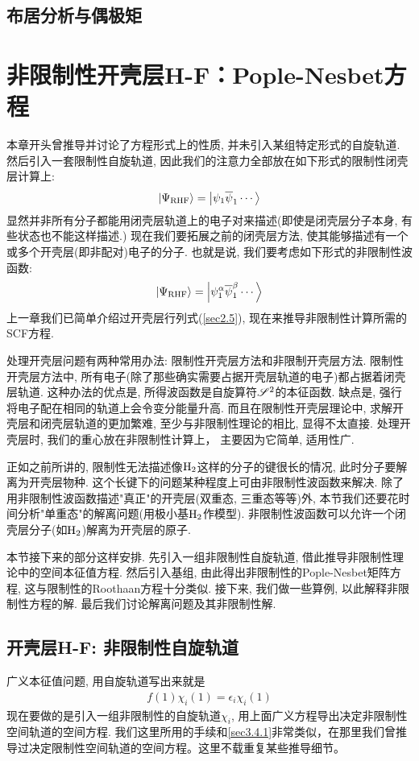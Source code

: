 {\subsection{布居分析与偶极矩}

\section{非限制性开壳层H-F：Pople-Nesbet方程}
本章开头曾推导并讨论了\hft 方程形式上的性质, 并未引入某组特定形式的自旋轨道. 然后引入一套限制性自旋轨道, 因此我们的注意力全部放在如下形式的限制性闭壳层计算上:
\begin{align}
\Ket{\Psi_\mathrm{RHF}} = \Ket{\psi_1\overline{\psi}_1\cdots}
\end{align}
显然并非所有分子都能用闭壳层轨道上的电子对来描述(即使是闭壳层分子本身, 有些状态也不能这样描述.) 现在我们要拓展之前的闭壳层方法, 使其能够描述有一个或多个开壳层(即非配对)电子的分子. 也就是说, 我们要考虑如下形式的非限制性波函数:
\begin{align}
\Ket{\Psi_\mathrm{RHF}} = \Ket{\psi_1^\alpha\overline{\psi}_1^\beta\cdots}
\end{align}
上一章我们已简单介绍过开壳层行列式(\ref{sec2.5}), 现在来推导非限制性计算所需的SCF方程.

处理开壳层问题有两种常用办法: 限制性开壳层\hft 方法和非限制开壳层\hft 方法. 限制性开壳层方法中, 所有电子(除了那些确实需要占据开壳层轨道的电子)都占据着闭壳层轨道. 这种办法的优点是, 所得波函数是自旋算符$\mathscr{S}^2$的本征函数. 缺点是, 强行将电子配在相同的轨道上会令变分能量升高. 而且在限制性开壳层\hft 理论中, 求解开壳层和闭壳层轨道的更加繁难, 至少与非限制性\hft 理论的相比, 显得不太直接. 处理开壳层时, 我们的重心放在非限制性计算上， 主要因为它简单, 适用性广.

正如之前所讲的, 限制性\hft  无法描述像$\mathrm{H}_2$这样的分子的键很长的情况, 此时分子要解离为开壳层物种. 这个长键下的问题某种程度上可由非限制性波函数来解决. 除了用非限制性波函数描述"真正"的开壳层(双重态, 三重态等等)外, 本节我们还要花时间分析"单重态"的解离问题(用极小基$\mathrm{H}_2$作模型). 非限制性波函数可以允许一个闭壳层分子(如$\mathrm{H}_2$)解离为开壳层的原子.

本节接下来的部分这样安排. 先引入一组非限制性自旋轨道, 借此推导非限制性\hft 理论中的空间本征值方程. 然后引入基组, 由此得出非限制性的Pople-Nesbet矩阵方程, 这与限制性的Roothaan方程十分类似. 接下来, 我们做一些算例, 以此解释非限制性方程的解. 最后我们讨论解离问题及其非限制性解.
\subsection{开壳层H-F: 非限制性自旋轨道}
广义\hft 本征值问题, 用自旋轨道写出来就是
\begin{align}
f(1)\chi_i(1) = \epsilon_i \chi_i(1)
\end{align}
现在要做的是引入一组非限制性的自旋轨道$\chi_i$, 用上面广义\hft 方程导出决定非限制性空间轨道的空间方程. 我们这里所用的手续和\ref{sec3.4.1}非常类似，在那里我们曾推导过决定限制性空间轨道的空间方程。这里不载重复某些推导细节。

}
